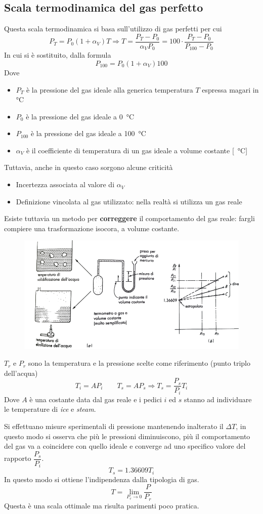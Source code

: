 \documentclass[a4paper, 15pt]{article}
\newcommand{\xmark}{\ding{55}}
\begin{document}
\subsection{Scala termodinamica del gas perfetto}
\begin{adjustwidth}{2in}{}
	Questa scala termodinamica si basa sull'utilizzo di gas perfetti per cui
	\[P_T = P_0(1+\alpha_V)T \Rightarrow T = \dfrac{P_T-P_0}{\alpha_VP_0} = 100\cdot\dfrac{P_T-P_0}{P_{100}-P_0}\]
	In cui si è sostituito, dalla formula
	\[P_{100} = P_0(1+\alpha_V)100\]
	Dove 
	\begin{itemize}
		\item $P_T$ è la pressione del gas ideale alla generica temperatura $T$ espressa magari in \unit{\degreeCelsius}
		\item $P_0$ è la pressione del gas ideale a \SI{0}{\degreeCelsius}
		\item $P_{100}$ è la pressione del gas ideale a \SI{100}{\degreeCelsius}
		\item $\alpha_V$ è il coefficiente di temperatura di un gas ideale a volume  costante [\unit{\per\degreeCelsius}]
	\end{itemize}
		Tuttavia, anche in questo caso sorgono alcune criticità
	\begin{itemize}[label=\textcolor{red}{\xmark}]
		\item Incertezza associata al valore di $\alpha_V$
		\item Definizione vincolata al gas utilizzato: nella realtà si utilizza un gas reale
	\end{itemize}
	Esiste tuttavia un metodo per \textbf{correggere} il comportamento del gas reale: fargli compiere una trasformazione isocora, a volume costante.
	\begin{figure}[H]
		\centering
		\includegraphics[width=0.4\linewidth]{immagini/screenshot001}
		\label{fig:screenshot001}
	\end{figure}
	$T_r$ e $P_r$ sono la temperatura e la pressione scelte come riferimento (punto triplo dell'acqua)
	\[T_i = AP_i\qquad T_s = AP_s \Rightarrow T_s = \dfrac{P_s}{P_i}T_i\]
	Dove $A$ è una costante data dal gas reale e i pedici $i$ ed $s$ stanno ad individuare le temperature di \textit{ice} e \textit{steam}. \newline
	
	Si effettuano misure sperimentali di pressione mantenendo inalterato il $\Delta T$, in questo modo si osserva che più le pressioni diminuiscono, più il comportamento del gas va a coincidere con quello ideale e converge ad uno specifico valore del rapporto $\dfrac{P_s}{P_i}$. 
	\[T_s =  1.36609T_i\]
	In questo modo si ottiene l'indipendenza dalla tipologia di gas.
	\[T = \lim_{P_r\rightarrow0}\dfrac{P}{P_r}\] 
	Questa è una scala ottimale ma risulta parimenti poco pratica.
\end{adjustwidth}
\newpage
\end{document}
